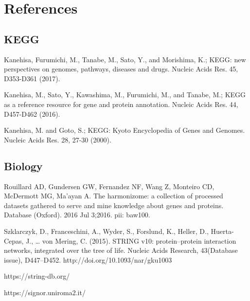\section{References}

\subsection{KEGG}

 Kanehisa, Furumichi, M., Tanabe, M., Sato, Y., and Morishima, K.; 
\newblock KEGG: new perspectives on genomes, pathways, diseases and drugs. 
\newblock Nucleic Acids Res. 45, D353-D361 (2017).

 Kanehisa, M., Sato, Y., Kawashima, M., Furumichi, M., and Tanabe, M.; 
\newblock KEGG as a reference resource for gene and protein annotation. 
\newblock Nucleic Acids Res. 44, D457-D462 (2016).

 Kanehisa, M. and Goto, S.; 
\newblock KEGG: Kyoto Encyclopedia of Genes and Genomes. 
\newblock Nucleic Acids Res. 28, 27-30 (2000). 

\subsection{Biology}

 Rouillard AD, Gundersen GW, Fernandez NF, Wang Z, Monteiro CD, McDermott MG, Ma'ayan A. 
\newblock The harmonizome: a collection of processed datasets gathered to serve and mine knowledge about genes and proteins. 
\newblock Database (Oxford). 2016 Jul 3;2016. pii: baw100.

Szklarczyk, D., Franceschini, A., Wyder, S., Forslund, K., Heller, D., Huerta-Cepas, J., … von Mering, C. (2015). 
\newblock STRING v10: protein–protein interaction networks, integrated over the tree of life. 
\newblock Nucleic Acids Research, 43(Database issue), D447–D452. http://doi.org/10.1093/nar/gku1003

 https://string-db.org/

https://signor.uniroma2.it/

